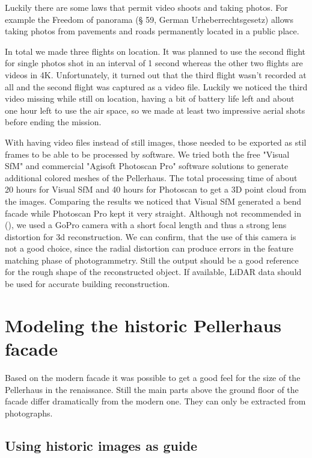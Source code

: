 Luckily there are some laws that permit video shoots and taking photos. For example the Freedom of panorama (§ 59, German Urheberrechtsgesetz) allows taking photos from pavements and roads permanently located in a public place.

In total we made three flights on location. It was planned to use the second flight for single photos shot in an interval of 1 second whereas the other two flights are videos in 4K. Unfortunately, it turned out that the third flight wasn't recorded at all and the second flight was captured as a video file. Luckily we noticed the third video missing while still on location, having a bit of battery life left and about one hour left to use the air space, so we made at least two impressive aerial shots before ending the mission.

With having video files instead of still images, those needed to be exported as stil frames to be able to be processed by software. We tried both the free "Visual SfM" and commercial "Agisoft Photoscan Pro" software solutions to generate additional colored meshes of the Pellerhaus. The total processing time of about 20 hours for Visual SfM and 40 hours for Photoscan to get a 3D point cloud from the images. Comparing the results we noticed that Visual SfM generated a bend facade while Photoscan Pro kept it very straight. Although not recommended in (), we used a GoPro camera with a short focal length and thus a strong lens distortion for 3d reconstruction. We can confirm, that the use of this camera is not a good choice, since the radial distortion can produce errors in the feature matching phase of photogrammetry. Still the output should be a good reference for the rough shape of the reconstructed object. If available, LiDAR data should be used for accurate building reconstruction.

\section{Modeling the historic Pellerhaus facade}

Based on the modern facade it was possible to get a good feel for the size of the Pellerhaus in the renaissance. Still the main parts above the ground floor of the facade differ dramatically from the modern one. They can only be extracted from photographs.

\subsection{Using historic images as guide}

